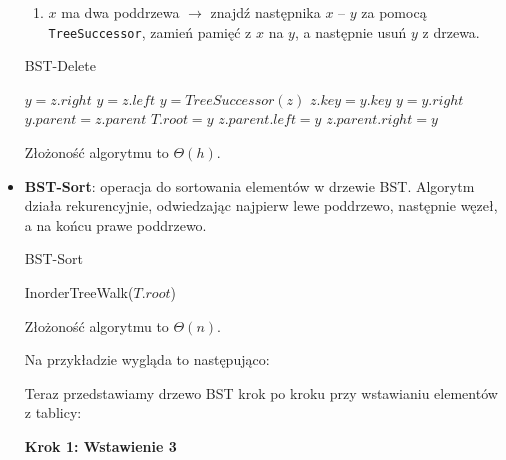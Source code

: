 \documentclass[11pt,a4paper]{article}
\begin{document}
\begin{itemize}
\begin{enumerate}
            \item $x$ ma dwa poddrzewa $\rightarrow$ znajdź następnika $x$ -- $y$ za pomocą \texttt{TreeSuccessor}, zamień pamięć z $x$ na $y$, a następnie usuń $y$ z drzewa.
        \end{enumerate}
        \begin{algorithm}
            \caption{BST-Delete}
            \begin{algorithmic}[1]
                    $y = z.right$
                    $y = z.left$
                \Else
                    $y = TreeSuccessor(z)$
                    $z.key = y.key$
                    $y = y.right$
                \EndIf
                $y.parent = z.parent$
                    $T.root = y$
                    $z.parent.left = y$
                \Else
                    $z.parent.right = y$
                    \EndIf
                    \EndProcedure
                \end{algorithmic}
            \end{algorithm}
            Złożoność algorytmu to $\Theta(h)$.
        \item \textbf{BST-Sort}: operacja do sortowania elementów w drzewie BST. Algorytm działa rekurencyjnie, odwiedzając najpierw lewe poddrzewo, następnie węzeł, a na końcu prawe poddrzewo.

            \begin{algorithm}
                \caption{BST-Sort}
                \begin{algorithmic}[1]
                    \State InorderTreeWalk($T.root$)
                    \EndProcedure
                \end{algorithmic}
            \end{algorithm}

            Złożoność algorytmu to $\Theta(n)$.

            Na przykładzie wygląda to następująco:

            Teraz przedstawiamy drzewo BST krok po kroku przy wstawianiu elementów z tablicy:
        \begin{center}
            \textbf{Krok 1: Wstawienie 3}\\[0.5ex]
            \bigskip


\end{center}
\end{itemize}
\end{document}
